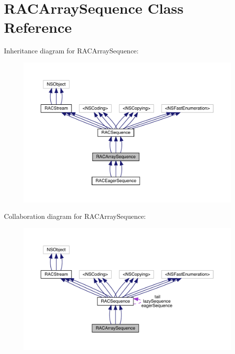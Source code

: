 \hypertarget{interface_r_a_c_array_sequence}{}\section{R\+A\+C\+Array\+Sequence Class Reference}
\label{interface_r_a_c_array_sequence}


Inheritance diagram for R\+A\+C\+Array\+Sequence\+:\nopagebreak
\begin{figure}[H]
\begin{center}
\leavevmode
\includegraphics[width=350pt]{interface_r_a_c_array_sequence__inherit__graph}
\end{center}
\end{figure}


Collaboration diagram for R\+A\+C\+Array\+Sequence\+:\nopagebreak
\begin{figure}[H]
\begin{center}
\leavevmode
\includegraphics[width=350pt]{interface_r_a_c_array_sequence__coll__graph}
\end{center}
\end{figure}
